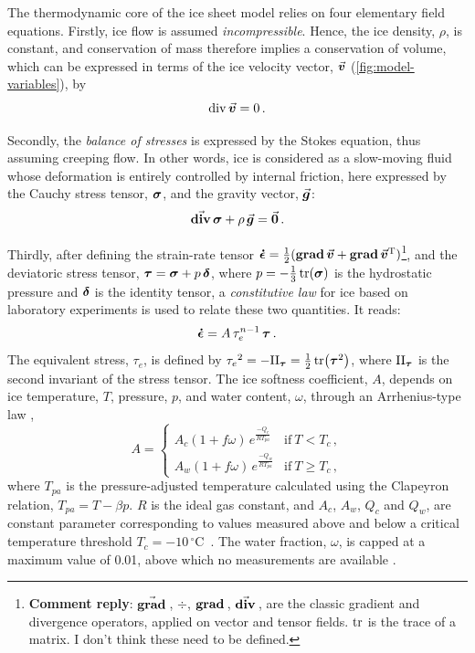 \documentclass{article}
\newcommand{\renote}[1]{\footnote{\textbf{Comment reply}: #1}}
\newcommand{\vect}[1]{\va*{#1}} %
\newcommand{\tens}[1]{\vb*{#1}} %
\renewcommand{\div}[1]{\mathrm{div}\,#1}            %
\renewcommand{\grad}[1]{\vect{\mathrm{grad}}\,#1}   %
\newcommand{\tdiv}[1]{\vect{\mathrm{div}}\,#1}      %
\newcommand{\tgrad}[1]{\tens{\mathrm{grad}}\,#1}    %
\newcommand{\doteps}[0]{\dot{\epsilon}} %
\newcommand{\IDT}[0]{\tens{\delta}}     %
\newcommand{\CST}[0]{\tens{\sigma}}     %
\newcommand{\DST}[0]{\tens{\tau}}       %
\newcommand{\SRT}[0]{\tens{\doteps}}    %
\newcommand{\vv}[0]{\vect{v}}           %
\newcommand{\unit}[1]{\ensuremath{\mathrm{#1}}}
\newcommand{\degree}[0]{\ensuremath{^{\circ}}}
\newcommand{\degC}[0]{\unit{{\degree}C}}
\begin{document}
The thermodynamic core of the ice sheet model relies on four elementary field
equations. Firstly, ice flow is assumed \emph{incompressible}. Hence, the ice
density, $\rho$, is constant, and
conservation of mass therefore implies a conservation of volume, which can be expressed
in terms of the ice velocity vector, $\vv$ (\cref{fig:model-variables}), by
\begin{equation}
    \label{eqn:incompressibility}
    \div{\vv} = 0 \,.
\end{equation}

Secondly, the \emph{balance of stresses} is expressed by the Stokes equation,
thus assuming creeping flow. In other words, ice is considered as a slow-moving
fluid whose deformation is entirely controlled by internal friction, here
expressed by the Cauchy stress tensor, $\CST$, and the gravity vector,
$\vect{g}$:
\begin{equation}
    \label{eqn:stressbalance}
    \tdiv{\CST} + \rho\,\vect{g} = \vect{0} \,.
\end{equation}

Thirdly, after defining the strain-rate tensor
${\SRT = \frac{1}{2}(\tgrad{\vv} + \tgrad{\vv}^{\mathrm{T}})}$\renote{
  $\grad$, $\div$, $\tgrad$, $\tdiv$, are the classic gradient and divergence operators, applied on vector and tensor fields. $\tr$ is the trace of a matrix. I don't think these need to be defined.},
and the deviatoric stress tensor, ${\DST = \CST + p\,\IDT}$,
where $p=-\frac{1}{3}\tr(\CST)$ is the hydrostatic pressure and
$\tens{\delta}$ is the identity tensor, a \emph{constitutive law} for ice
\citep{Nye.1953} based on laboratory experiments \citep{Glen.1952} is used to
relate these two quantities. It reads:
\begin{equation}
    \label{eqn:glenslaw}
    \SRT = A\,\tau_e^{n-1}\,\DST \,.
\end{equation}
The equivalent stress, $\tau_e$, is defined by
${\tau_e}^2 = -\mathrm{II}_{\DST} = \frac{1}{2} \tr(\DST^2)$,
where $\mathrm{II}_{\DST}$ is the second invariant of the stress tensor.
The ice softness coefficient, $A$, depends on ice temperature, $T$, pressure, $p$, and
water content, $\omega$, through an Arrhenius-type law
\citep[Eqs.~63--65]{Paterson.Budd.1982, Aschwanden.etal.2012},
\begin{equation}
    A =
    \begin{cases}
        A_c (1+f\omega)\,e^\frac{-Q_c}{RT_{pa}}
            & \text{if}\ T < T_c \,, \\
        A_w (1+f\omega)\,e^\frac{-Q_w}{RT_{pa}}
            & \text{if}\ T \ge T_c \,,
    \end{cases}
\end{equation}
where $T_{pa}$ is the pressure-adjusted temperature calculated using the
Clapeyron relation, ${T_{pa} = T - \beta p}$. $R$ is the ideal gas constant,
and $A_c$, $A_w$, $Q_c$ and $Q_w$, are constant parameter corresponding to
values measured above and below a critical temperature threshold
${T_c=-10}$\,\degC\ \citep[\cref{tab:iceflowparams};][]{Paterson.Budd.1982}.
The water fraction, $\omega$, is capped at a maximum value of 0.01, above which
no measurements are available \citep[Eq.~5.7]{Lliboutry.Duval.1985,
Greve.1997}.
\end{document}
